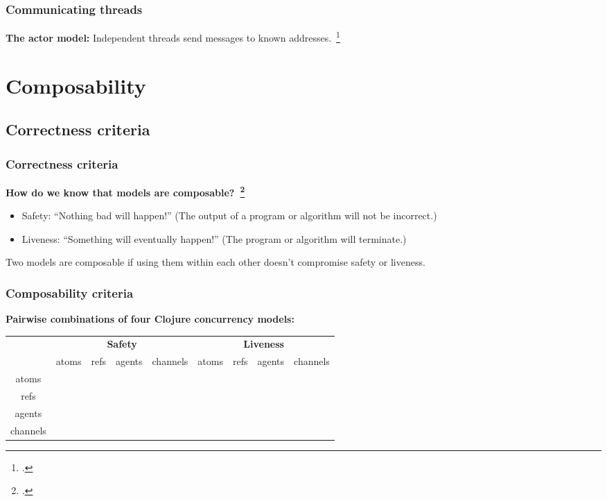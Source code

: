 \documentclass[aspectratio=1610]{beamer}
\begin{document}
  \begin{frame}
    \frametitle{Communicating threads}
    \centering
    
    \vfill
    \textbf{The actor model:} Independent threads send messages to known addresses.~\footcite{Agha1986}
  \end{frame}


  \section{Composability}

  \subsection{Correctness criteria}

  \begin{frame}
    \frametitle{Correctness criteria}

    \textbf{How do we know that models are composable?~\footcite{Swalens2014}}

    \begin{itemize}
      \item Safety: ``Nothing bad will happen!'' (The output of a program or algorithm will not be incorrect.)
      \item Liveness: ``Something will eventually happen!'' (The program or algorithm will terminate.)
    \end{itemize}

    Two models are composable if using them within each other doesn't compromise safety or liveness.
  \end{frame}

  \begin{frame}
    \frametitle{Composability criteria}
    \centering
    \small

    \newcommand{\n}{\textcolor{red}{\ding{55}}}
    \newcommand{\y}{\textcolor{olive}{\ding{51}}}

    \textbf{Pairwise combinations of four Clojure concurrency models:}
    \vfill
    \begin{tabular}{c | c c c c | c c c c}
      & \multicolumn{4}{c|}{\textbf{Safety}} & \multicolumn{4}{|c}{\textbf{Liveness}} \\
      & atoms & refs & agents & channels & atoms & refs & agents & channels \\
      \hline
      atoms & \n & \n & \n & \n & \y & \y & \y & \n \\
      refs & \n & \y & \y & \n & \y & \y & \y & \n \\
      agents & \y & \y & \y & \y & \y & \y & \y & \n \\
      channels & \y & \y & \y & \y & \y & \y & \n & \n
    \end{tabular}
  \end{frame}
\end{document}
